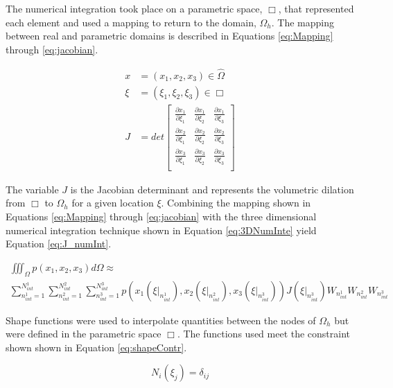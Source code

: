 \documentclass[a4paper, 12pt]{article}
\begin{document}
The numerical integration took place on a parametric space, $\Box$, that represented each 
element and used a mapping to return to the domain, $\Omega_h$. 
The mapping between real and parametric domains is described in 
Equations \ref{eq:Mapping} through \ref{eq:jacobian}.

\begin{align} 
x   &= (x_1, x_2, x_3) \in \hat{\Omega}
  \label{eq:Mapping} \\
\xi &= (\xi_1, \xi_2, \xi_3) \in \Box \\
J &= det
  \begin{bmatrix}
    \frac{\partial x_1}{\partial \xi_1} & 
      \frac{\partial x_1}{\partial \xi_2} & 
      \frac{\partial x_1}{\partial \xi_3} \\
    \frac{\partial x_2}{\partial \xi_1} & 
      \frac{\partial x_2}{\partial \xi_2} & 
      \frac{\partial x_2}{\partial \xi_3} \\
    \frac{\partial x_3}{\partial \xi_1} & 
      \frac{\partial x_3}{\partial \xi_2} & 
      \frac{\partial x_3}{\partial \xi_3} \\
  \end{bmatrix}
  \label{eq:jacobian}
\end{align}

\noindent
The variable $J$ is the Jacobian determinant and represents
the volumetric dilation from $\Box$ to $\Omega_h$ for a given location $\xi$.
Combining the mapping shown in Equations \ref{eq:Mapping} through
\ref{eq:jacobian} with the three dimensional numerical 
integration technique shown in Equation \ref{eq:3DNumInte} yield
Equation \ref{eq:J_numInt}.

\begin{multline} \label{eq:J_numInt}
\iiint_{\Omega} p(x_1, x_2, x_3) d\Omega
  \approx \\
  \sum_{n^1_{int}=1}^{N^1_{int}} 
  \sum_{n^2_{int}=1}^{N^2_{int}} 
  \sum_{n^3_{int}=1}^{N^3_{int}} 
  p(
  x_1(\xi\Big|_{n^1_{int}}),
  x_2(\xi\Big|_{n^2_{int}}),
  x_3(\xi\Big|_{n^3_{int}}))
  J( \xi\Big|_{n^3_{int}})
  W_{n^1_{int}}
  W_{n^2_{int}}
  W_{n^3_{int}}
\end{multline}

Shape functions were used to interpolate quantities between the
nodes of $\Omega_h$ but were defined in the parametric space $\Box$.
The functions used meet the constraint shown
shown in Equation \ref{eq:shapeContr}.

\begin{equation} \label{eq:shapeContr}
N_i(\xi_j) = \delta_{ij}
\end{equation}
\end{document}
